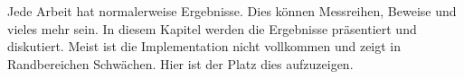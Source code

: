
Jede Arbeit hat normalerweise Ergebnisse. Dies können Messreihen, Beweise und vieles mehr sein. In diesem Kapitel werden die Ergebnisse präsentiert und diskutiert. Meist ist die Implementation nicht vollkommen und zeigt in Randbereichen Schwächen. Hier ist der Platz dies aufzuzeigen.

